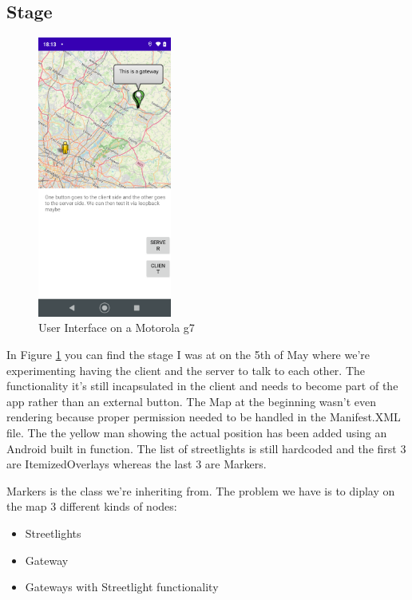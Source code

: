\documentclass[a4paper,12pt]{book}
\begin{document}
\clearpage

\subsection{Stage}

\begin{figure}
\includegraphics[width=4.4cm]{./current_status_g7.PNG}
\caption{User Interface on a Motorola g7}\label{fig:early}
\end{figure}

In Figure \ref{fig:early} you can find the stage I was at on the 5th of May where we're experimenting having the client and the server to talk to each other. The functionality it's still incapsulated in the client and needs to become part of the app rather than an external button. The Map at the beginning wasn't even rendering because proper permission needed to be handled in the Manifest.XML file. The the yellow man showing the actual position has been added using an Android built in function. The list of streetlights is still hardcoded and the first 3 are ItemizedOverlays whereas the last 3 are Markers.

Markers is the class we're inheriting from. The problem we have is to diplay on the map 3 different kinds of nodes:

\bigskip

\begin{itemize}
\item Streetlights
\item Gateway
\item {Gateways with Streetlight functionality}
\end{itemize}
\end{document}
